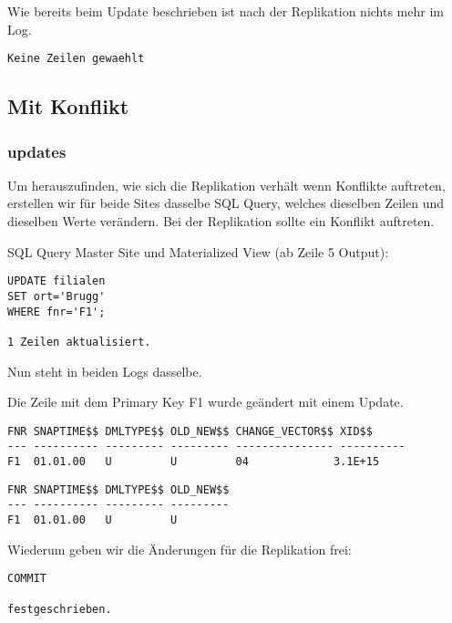 \documentclass[11pt,a4paper,parskip=half]{scrartcl}
\begin{document}
Wie bereits beim Update beschrieben ist nach der Replikation nichts mehr im Log.
\begin{lstlisting}
Keine Zeilen gewaehlt
\end{lstlisting}

\subsection{Mit Konflikt}
\subsubsection{updates}
Um herauszufinden, wie sich die Replikation verhält wenn Konflikte auftreten, erstellen wir für beide Sites dasselbe SQL Query, welches dieselben Zeilen und dieselben Werte verändern. Bei der Replikation sollte ein Konflikt auftreten.

SQL Query Master Site und Materialized View (ab Zeile 5 Output):
\begin{lstlisting}
UPDATE filialen
SET ort='Brugg'
WHERE fnr='F1'; 

1 Zeilen aktualisiert.
\end{lstlisting}

Nun steht in beiden Logs dasselbe.

Die Zeile mit dem Primary Key F1 wurde geändert mit einem Update.
\begin{lstlisting}
FNR SNAPTIME$$ DMLTYPE$$ OLD_NEW$$ CHANGE_VECTOR$$ XID$$
--- ---------- --------- --------- --------------- ----------
F1  01.01.00   U         U         04             3.1E+15 
\end{lstlisting}
\begin{lstlisting}
FNR SNAPTIME$$ DMLTYPE$$ OLD_NEW$$
--- ---------- --------- ---------
F1  01.01.00   U         U         
\end{lstlisting}

Wiederum geben wir die Änderungen für die Replikation frei:
\begin{lstlisting}
COMMIT

festgeschrieben.
\end{lstlisting}
\end{document}
